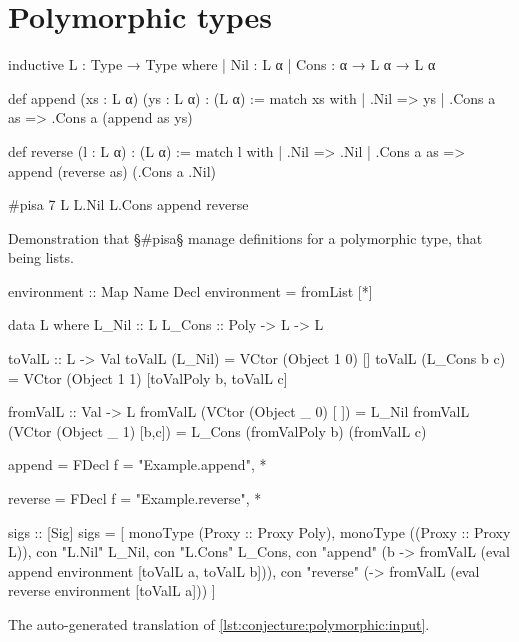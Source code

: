 \section{Polymorphic types}\label{app:poly}

\vspace{-0.5cm}
\begin{listing}[H]
\begin{LeanCode}
inductive L : Type → Type where
  | Nil : L α
  | Cons : α → L α → L α

def append (xs : L α) (ys : L α) : (L α) :=
  match xs with
  | .Nil => ys
  | .Cons a as => .Cons a (append as ys)

def reverse (l : L α) : (L α) :=
  match l with
  | .Nil => .Nil
  | .Cons a as => append (reverse as) (.Cons a .Nil)

#pisa 7 L L.Nil L.Cons append reverse
\end{LeanCode}
\caption
  [Benchmark with definitions for polymorphic lists.]
  {Demonstration that §\#pisa§ manage definitions for a polymorphic type, that being lists.}
\label{lst:conjecture:polymorphic:input}
\end{listing}

\begin{listing}[H]
\begin{HaskellCode}
environment :: Map Name Decl
environment = fromList [*\truncated*]

data L where
  L_Nil :: L
  L_Cons :: Poly -> L -> L

toValL :: L -> Val
toValL (L_Nil)      = VCtor (Object 1 0) []
toValL (L_Cons b c) = VCtor (Object 1 1) [toValPoly b, toValL c]

fromValL :: Val -> L
fromValL (VCtor (Object _ 0) [   ]) = L_Nil
fromValL (VCtor (Object _ 1) [b,c]) = L_Cons (fromValPoly b) (fromValL c)

append = FDecl {f = "Example.append", *\truncated*}

reverse = FDecl {f = "Example.reverse", *\truncated*}

sigs :: [Sig]
sigs =
  [ monoType (Proxy :: Proxy Poly),
    monoType ((Proxy :: Proxy L)),
    con "L.Nil" L_Nil,
    con "L.Cons" L_Cons,
    con "append" (\a b -> fromValL
      (eval append environment [toValL a, toValL b])),
    con "reverse" (\a -> fromValL (eval reverse environment [toValL a]))
  ]
\end{HaskellCode}
\caption{The auto-generated translation of \cref{lst:conjecture:polymorphic:input}.}
\label{lst:conjecture:polymorphic:code}
\end{listing}

